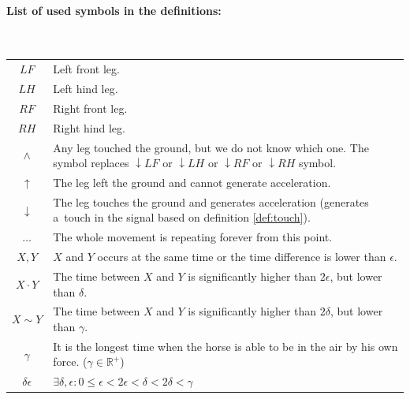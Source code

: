 \paragraph{List of used symbols in the definitions:}\quad\\
\begin{tabular}{c|p{.9\linewidth}}
    $LF$                   & Left front leg. \\
    $LH$                   & Left hind leg. \\
    $RF$                   & Right front leg. \\
    $RH$                   & Right hind leg. \\
    $\wedge$               & Any leg touched the ground, but we do not know which one. The symbol replaces $\downarrow LF$ or $\downarrow LH$ or $\downarrow RF$ or $\downarrow RH$ symbol. \\
    $\uparrow$             & The leg left the ground and cannot generate acceleration. \\
    $\downarrow$           & The leg touches the ground and generates acceleration (generates a~touch in the signal based on definition \ref{def:touch}). \\
    $\dots$                & The whole movement is repeating forever from this point. \\
    $X, Y$                 & $X$ and $Y$ occurs at the same time or the time difference is lower than $\epsilon$. \\
    $X \cdot Y$            & The time between $X$ and $Y$ is significantly higher than $2\epsilon$, but lower than $\delta$. \\
    $X \sim Y$             & The time between $X$ and $Y$ is significantly higher than $2\delta$, but lower than $\gamma$. \\
    $\gamma$                & It is the longest time when the horse is able to be in the air by his own force. ($\gamma \in \mathbb{R^{+}}$) \\
    $\delta\epsilon$ & $ \exists \delta, \epsilon : 0 \leq \epsilon < 2\epsilon < \delta < 2\delta < \gamma $ \\
\end{tabular}

